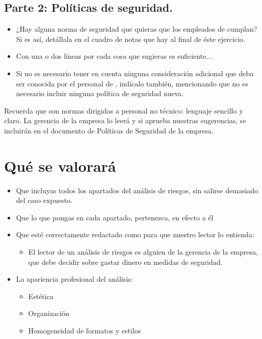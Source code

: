 \subsection{Parte 2: Políticas de seguridad.}


\begin{itemize}
\item ¿Hay alguna norma de seguridad que quieras que los empleados de {\nombreempresa} cumplan? Si es así, detállala en  el cuadro de notas que hay al final de éste ejercicio.
  
\item Con una o dos líneas por cada cosa que sugieras es   suficiente...
  
\item Si no es necesario tener en cuenta ninguna consideración adicional que deba ser conocida por el personal  de {\nombreempresa}, indícalo también, mencionando que no es necesario incluir ninguna política de seguridad nueva.
\end{itemize}

Recuerda que son normas dirigidas a personal no técnico: lenguaje sencillo y claro. La gerencia de la empresa lo leerá y si aprueba nuestras sugerencias, se incluirán en el documento de Políticas de Seguridad de la empresa.

\section{Qué se valorará}
\begin{itemize}
\item Que incluyas todos los apartados del análisis de riesgos, sin salirse demasiado del caso expuesto.
\item Que lo que pongas en cada apartado, pertenezca, en efecto a él
\item Que esté correctamente redactado como para que nuestro lector lo entienda:
  \begin{itemize}
  \item El lector de un análisis de riesgos es alguien de la gerencia de la empresa, que debe decidir sobre gastar  dinero en medidas de seguridad.
  \end{itemize}
\item La apariencia profesional del análisis:
  \begin{itemize}
  \item Estética
  \item Organización
  \item Homogeneidad de formatos y estilos
  \end{itemize}
\end{itemize}

